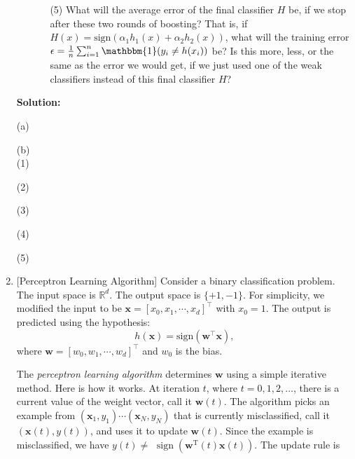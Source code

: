 \documentclass[10pt]{article}
\begin{document}
\begin{enumerate}[1.]
\begin{itemize}
\begin{enumerate}
			        \item[(5)] What will the average error of the final classifier $H$ be, if we stop after these two rounds of boosting? That is, if $H(x) = \text{sign}(\alpha_{1}h_{1}(x) + \alpha_{2}h_{2}(x))$, what will the  training error $\epsilon = \frac{1}{n} \sum_{i=1}^{n} \mathbbm{1} (y_{i} \neq h(x_{i}))$ be? Is this more, less, or the same as the error we would get, if we just used one of the weak classifiers instead of this final classifier $H$?~\\

		        \end{enumerate}
        \end{itemize}
		\textbf{Solution:}

(a)




(b)\\
(1)




(2)




(3)




(4)




(5)
        
        
        
        
        
        
        
        
        
        \newpage

	\item {} [Perceptron Learning Algorithm]
            Consider a binary classification problem. The input space is $\mathbb{R}^{d}$. The output space is $\{ +1, -1 \}$. For simplicity, we modified the input to be $\mathbf{x} = [x_0, x_1, \cdots, x_d]^{\intercal}$ with $x_0=1$. The output is predicted using the hypothesis:
            \begin{equation}
                h(\mathbf{x}) = \text{sign}(\mathbf{w}^{\intercal}\mathbf{x}),
            \end{equation}
            where $\mathbf{w} = [w_0, w_1, \cdots, w_d]^{\intercal}$ and $w_0$ is the bias.
            
            The \textit{perceptron learning algorithm} determines $\mathbf{w}$ using a simple iterative method. Here is how it works. At iteration $t$, where $t=0,1,2, \ldots$, there is a current value of the weight vector, call it $\mathbf{w}(t)$. The algorithm picks an example from $\left(\mathbf{x}_1, y_1\right) \cdots\left(\mathbf{x}_N, y_N\right)$ that is currently misclassified, call it $(\mathbf{x}(t), y(t))$, and uses it to update $\mathbf{w}(t)$. Since the example is misclassified, we have $y(t) \neq$ $\operatorname{sign}\left(\mathbf{w}^{\mathrm{T}}(t) \mathbf{x}(t)\right)$. The update rule is


\end{enumerate}
\end{document}
